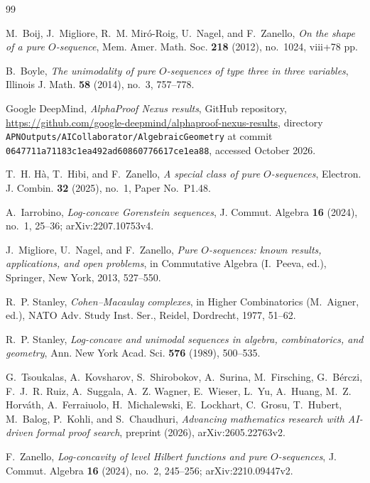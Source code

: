 \documentclass{amsart}
\theoremstyle{definition}
\theoremstyle{remark}
\begin{document}
\begin{thebibliography}{99}

M.~Boij, J.~Migliore, R.~M. Mir\'o-Roig, U.~Nagel, and F.~Zanello, \emph{On the shape of a pure $O$-sequence}, Mem. Amer. Math. Soc. \textbf{218} (2012), no.~1024, viii+78 pp.

B.~Boyle, \emph{The unimodality of pure $O$-sequences of type three in three variables}, Illinois J. Math. \textbf{58} (2014), no.~3, 757--778.

\begingroup\raggedright Google DeepMind, \emph{AlphaProof Nexus results}, GitHub repository, \url{https://github.com/google-deepmind/alphaproof-nexus-results}, directory \texttt{APNOutputs/AICollaborator/AlgebraicGeometry} at commit \texttt{0647711a71183c1ea492ad60860776617ce1ea88}, accessed October 2026.\par\endgroup

T.~H. H\`a, T.~Hibi, and F.~Zanello, \emph{A special class of pure $O$-sequences}, Electron. J. Combin. \textbf{32} (2025), no.~1, Paper No.~P1.48.

A.~Iarrobino, \emph{Log-concave Gorenstein sequences}, J. Commut. Algebra \textbf{16} (2024), no.~1, 25--36; arXiv:2207.10753v4.

J.~Migliore, U.~Nagel, and F.~Zanello, \emph{Pure $O$-sequences: known results, applications, and open problems}, in Commutative Algebra (I.~Peeva, ed.), Springer, New York, 2013, 527--550.

R.~P. Stanley, \emph{Cohen--Macaulay complexes}, in Higher Combinatorics (M.~Aigner, ed.), NATO Adv. Study Inst. Ser., Reidel, Dordrecht, 1977, 51--62.

R.~P. Stanley, \emph{Log-concave and unimodal sequences in algebra, combinatorics, and geometry}, Ann. New York Acad. Sci. \textbf{576} (1989), 500--535.

G.~Tsoukalas, A.~Kovsharov, S.~Shirobokov, A.~Surina, M.~Firsching, G.~B\'erczi, F.~J.~R. Ruiz, A.~Suggala, A.~Z. Wagner, E.~Wieser, L.~Yu, A.~Huang, M.~Z. Horv\'ath, A.~Ferraiuolo, H.~Michalewski, E.~Lockhart, C.~Grosu, T.~Hubert, M.~Balog, P.~Kohli, and S.~Chaudhuri, \emph{Advancing mathematics research with AI-driven formal proof search}, preprint (2026), arXiv:2605.22763v2.

F.~Zanello, \emph{Log-concavity of level Hilbert functions and pure $O$-sequences}, J. Commut. Algebra \textbf{16} (2024), no.~2, 245--256; arXiv:2210.09447v2.

\end{thebibliography}
\end{document}

